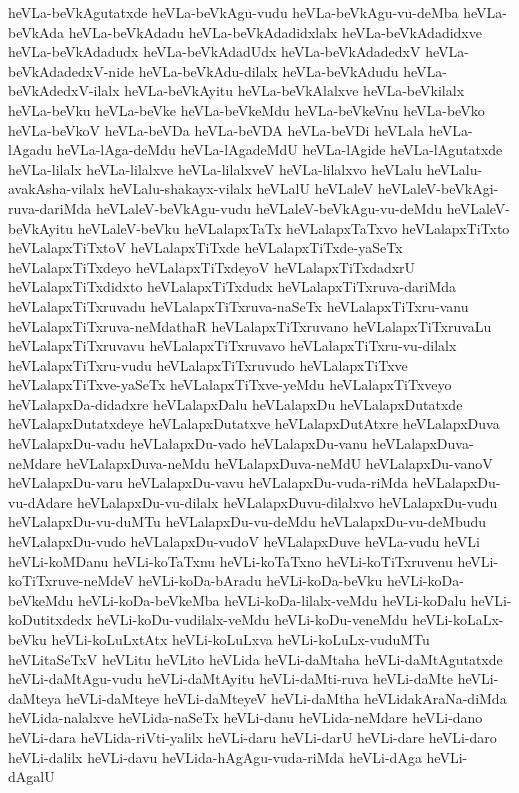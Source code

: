 {heVLa-beVkAgutatxde
heVLa-beVkAgu-vudu
heVLa-beVkAgu-vu-deMba
heVLa-beVkAda
heVLa-beVkAdadu
heVLa-beVkAdadidxlalx
heVLa-beVkAdadidxve
heVLa-beVkAdadudx
heVLa-beVkAdadUdx
heVLa-beVkAdadedxV
heVLa-beVkAdadedxV-nide
heVLa-beVkAdu-dilalx
heVLa-beVkAdudu
heVLa-beVkAdedxV-ilalx
heVLa-beVkAyitu
heVLa-beVkAlalxve
heVLa-beVkilalx
heVLa-beVku
heVLa-beVke
heVLa-beVkeMdu
heVLa-beVkeVnu
heVLa-beVko
heVLa-beVkoV
heVLa-beVDa
heVLa-beVDA
heVLa-beVDi
heVLala
heVLa-lAgadu
heVLa-lAga-deMdu
heVLa-lAgadeMdU
heVLa-lAgide
heVLa-lAgutatxde
heVLa-lilalx
heVLa-lilalxve
heVLa-lilalxveV
heVLa-lilalxvo
heVLalu
heVLalu-avakAsha-vilalx
heVLalu-shakayx-vilalx
heVLalU
heVLaleV
heVLaleV-beVkAgi-ruva-dariMda
heVLaleV-beVkAgu-vudu
heVLaleV-beVkAgu-vu-deMdu
heVLaleV-beVkAyitu
heVLaleV-beVku
heVLalapxTaTx
heVLalapxTaTxvo
heVLalapxTiTxto
heVLalapxTiTxtoV
heVLalapxTiTxde
heVLalapxTiTxde-yaSeTx
heVLalapxTiTxdeyo
heVLalapxTiTxdeyoV
heVLalapxTiTxdadxrU
heVLalapxTiTxdidxto
heVLalapxTiTxdudx
heVLalapxTiTxruva-dariMda
heVLalapxTiTxruvadu
heVLalapxTiTxruva-naSeTx
heVLalapxTiTxru-vanu
heVLalapxTiTxruva-neMdathaR
heVLalapxTiTxruvano
heVLalapxTiTxruvaLu
heVLalapxTiTxruvavu
heVLalapxTiTxruvavo
heVLalapxTiTxru-vu-dilalx
heVLalapxTiTxru-vudu
heVLalapxTiTxruvudo
heVLalapxTiTxve
heVLalapxTiTxve-yaSeTx
heVLalapxTiTxve-yeMdu
heVLalapxTiTxveyo
heVLalapxDa-didadxre
heVLalapxDalu
heVLalapxDu
heVLalapxDutatxde
heVLalapxDutatxdeye
heVLalapxDutatxve
heVLalapxDutAtxre
heVLalapxDuva
heVLalapxDu-vadu
heVLalapxDu-vado
heVLalapxDu-vanu
heVLalapxDuva-neMdare
heVLalapxDuva-neMdu
heVLalapxDuva-neMdU
heVLalapxDu-vanoV
heVLalapxDu-varu
heVLalapxDu-vavu
heVLalapxDu-vuda-riMda
heVLalapxDu-vu-dAdare
heVLalapxDu-vu-dilalx
heVLalapxDuvu-dilalxvo
heVLalapxDu-vudu
heVLalapxDu-vu-duMTu
heVLalapxDu-vu-deMdu
heVLalapxDu-vu-deMbudu
heVLalapxDu-vudo
heVLalapxDu-vudoV
heVLalapxDuve
heVLa-vudu
heVLi
heVLi-koMDanu
heVLi-koTaTxnu
heVLi-koTaTxno
heVLi-koTiTxruvenu
heVLi-koTiTxruve-neMdeV
heVLi-koDa-bAradu
heVLi-koDa-beVku
heVLi-koDa-beVkeMdu
heVLi-koDa-beVkeMba
heVLi-koDa-lilalx-veMdu
heVLi-koDalu
heVLi-koDutitxdedx
heVLi-koDu-vudilalx-veMdu
heVLi-koDu-veneMdu
heVLi-koLaLx-beVku
heVLi-koLuLxtAtx
heVLi-koLuLxva
heVLi-koLuLx-vuduMTu
heVLitaSeTxV
heVLitu
heVLito
heVLida
heVLi-daMtaha
heVLi-daMtAgutatxde
heVLi-daMtAgu-vudu
heVLi-daMtAyitu
heVLi-daMti-ruva
heVLi-daMte
heVLi-daMteya
heVLi-daMteye
heVLi-daMteyeV
heVLi-daMtha
heVLidakAraNa-diMda
heVLida-nalalxve
heVLida-naSeTx
heVLi-danu
heVLida-neMdare
heVLi-dano
heVLi-dara
heVLida-riVti-yalilx
heVLi-daru
heVLi-darU
heVLi-dare
heVLi-daro
heVLi-dalilx
heVLi-davu
heVLida-hAgAgu-vuda-riMda
heVLi-dAga
heVLi-dAgalU
}
